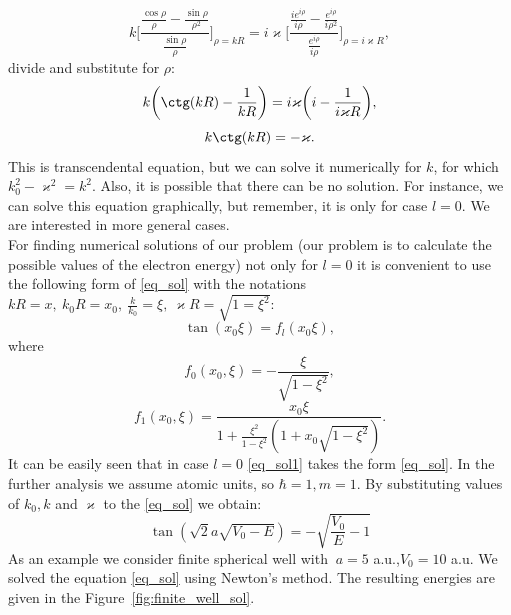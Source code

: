 \documentclass[a4paper, 11pt]{article}
\begin{document}
$$k \bigg[ \frac{\frac{\cos \rho}{\rho} - \frac{\sin \rho}{\rho^2}}{\frac{\sin \rho}{\rho}} \bigg]_{\rho = kR} = i \varkappa \bigg[ \frac{\frac{i e^{i \rho}}{i \rho} - \frac{e^{i \rho}}{i \rho^2}}{\frac{e^{i \rho}}{i \rho}} \bigg]_{\rho = i \varkappa R},
$$
divide and substitute for  $\rho$:
$$k \bigg(\ctg(kR)-\frac{1}{kR}\bigg) = i \varkappa \bigg( i - \frac{1}{i \varkappa R} \bigg),$$
\begin{equation}\label{eq_sol}
	k \ctg(kR) = - \varkappa.
\end{equation}
This is transcendental equation, but we can solve it numerically for  $k$,  for which $k_0^2-\varkappa^2=k^2.$ Also, it is possible that there can be no solution. For instance, we can solve this equation graphically, but remember, it is only for case $l=0.$ We are interested in more general cases.\\
For finding numerical solutions of our problem (our problem is to calculate the possible values of the electron energy) not only for $l=0$ it is convenient to use the following form of \eqref{eq_sol} with the notations $kR = x, ~k_0 R=x_0, ~\frac{k}{k_0} = \xi, ~\varkappa R = \sqrt{1=\xi^2}$:
\begin{equation}\label{eq_sol1}
	\tan(x_0 \xi) = f_l(x_0 \xi),
\end{equation}
where
$$f_0(x_0, \xi) = -\frac{\xi}{\sqrt{1-\xi^2}},$$
$$f_1(x_0, \xi) = \frac{x_0 \xi}{1+\frac{\xi^2}{1-\xi^2}(1+x_0 \sqrt{1-\xi^2})}.$$ 
It can be easily seen that in case $l=0$ \eqref{eq_sol1} takes the form \eqref{eq_sol}. In the further analysis we assume atomic units, so $\hbar = 1, m=1.$ By substituting values of $k_0, k$ and $\varkappa$ to the \eqref{eq_sol} we obtain:
$$\tan(\sqrt{2} a \sqrt{V_0-E})=-\sqrt{\frac{V_0}{E}-1}$$ 
As an example we consider finite spherical well with $\ a = 5 $ a.u.,$ V_0 = 10$ a.u. We solved the equation \eqref{eq_sol} using Newton's method. The resulting energies are given in the Figure~\ref{fig:finite_well_sol}.
\end{document}
